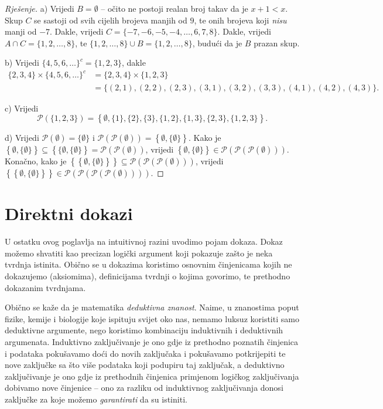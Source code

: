 \begin{proof}[Rješenje]
a) Vrijedi \(B=\emptyset\) -- očito ne postoji realan broj takav da je \(x+1<x\). Skup \(C\) se sastoji od svih cijelih brojeva manjih od \(9\), te onih brojeva koji \textit{nisu} manji od \(-7\). Dakle, vrijedi \(C=\{-7, -6, -5, -4, \dots, 6, 7, 8\}\). Dakle, vrijedi \(A\cap C=\{1, 2, \dots, 8\}\), te \(\{1, 2, \dots, 8\}\cup B=\{1, 2, \dots, 8\}\), budući da je \(B\) prazan skup.

b) Vrijedi \(\{4, 5, 6, \dots\}^c=\{1, 2, 3\}\), dakle 
\begin{align*}
\{2, 3, 4\}\times \{4, 5, 6, \dots\}^c&=\{2, 3, 4\}\times \{1, 2, 3\}\\
&=\{(2, 1), (2, 2), (2, 3), (3, 1), (3, 2), (3, 3), (4, 1), (4, 2), (4, 3)\}.
\end{align*}

c) Vrijedi
\[\mathcal{P}\left(\{1, 2, 3\}\right)=\left\{\emptyset, \{1\}, \{2\}, \{3\}, \{1, 2\}, \{1, 3\}, \{2, 3\}, \{1, 2, 3\}\right\}.\]

d) Vrijedi \(\mathcal{P}(\emptyset)=\{\emptyset\}\) i \(\mathcal{P}\left(\mathcal{P}\left(\emptyset\right)\right)=\left\{\emptyset, \{\emptyset\}\right\}\). Kako je \(\left\{\emptyset, \{\emptyset\}\right\}\subseteq \left\{\{\emptyset, \{\emptyset\}\right\}=\mathcal{P}\left(\mathcal{P}\left(\emptyset\right)\right)\), vrijedi \(\left\{\emptyset, \{\emptyset\}\right\}\in \mathcal{P}\left(\mathcal{P}\left(\mathcal{P}\left(\emptyset\right)\right)\right)\). Konačno, kako je \(\left\{\left\{\emptyset, \{\emptyset\}\right\}\right\}\subseteq \mathcal{P}\left(\mathcal{P}\left(\mathcal{P}\left(\emptyset\right)\right)\right)\), vrijedi \(\left\{\left\{\emptyset, \{\emptyset\}\right\}\right\}\in \mathcal{P}\left(\mathcal{P}\left(\mathcal{P}\left(\mathcal{P}\left(\emptyset\right)\right)\right)\right)\).
\end{proof}
\section{Direktni dokazi}
U ostatku ovog poglavlja na intuitivnoj razini uvodimo pojam dokaza. Dokaz možemo shvatiti kao precizan logički argument koji pokazuje zašto je neka tvrdnja istinita. Obično se u dokazima koristimo osnovnim činjenicama kojih ne dokazujemo (aksiomima), definicijama tvrdnji o kojima govorimo, te prethodno dokazanim tvrdnjama. 

Obično se kaže da je matematika \textit{deduktivna znanost}. Naime, u znanostima poput fizike, kemije i biologije koje ispituju svijet oko nas, nemamo luksuz koristiti samo deduktivne argumente, nego koristimo kombinaciju induktivnih i deduktivnih argumenata. Induktivno zaključivanje je ono gdje iz prethodno poznatih činjenica i podataka pokušavamo doći do novih zaključaka i pokušavamo potkrijepiti te nove zaključke sa što više podataka koji podupiru taj zaključak, a deduktivno zaključivanje je ono gdje iz prethodnih činjenica primjenom logičkog zaključivanja dobivamo nove činjenice -- ono za razliku od induktivnog zaključivanja donosi zaključke za koje možemo \textit{garantirati} da su istiniti. 

